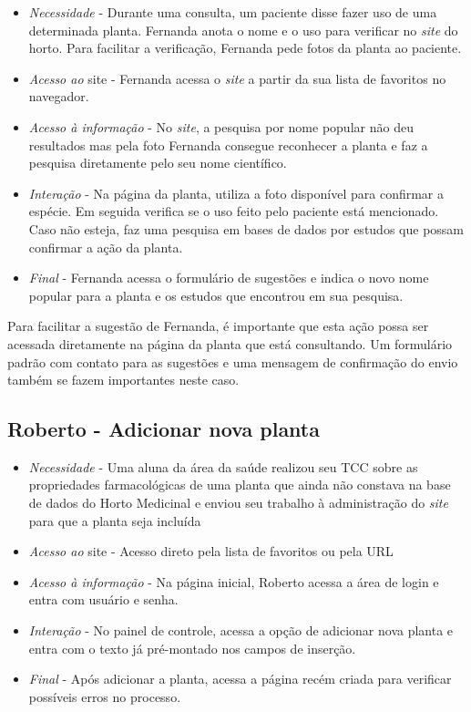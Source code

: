\begin{itemize}
\item
  \emph{Necessidade} - Durante uma consulta, um paciente disse fazer uso de uma determinada planta. Fernanda anota o nome e o uso para verificar no \emph{site} do horto. Para facilitar a verificação, Fernanda pede fotos da planta ao paciente.
\item
  \emph{Acesso ao} site - Fernanda acessa o \emph{site} a partir da sua lista de favoritos no navegador.
\item
  \emph{Acesso à informação} - No \emph{site}, a pesquisa por nome popular não deu resultados mas pela foto Fernanda consegue reconhecer a planta e faz a pesquisa diretamente pelo seu nome científico.
\item
  \emph{Interação} - Na página da planta, utiliza a foto disponível para confirmar a espécie. Em seguida verifica se o uso feito pelo paciente está mencionado. Caso não esteja, faz uma pesquisa em bases de dados por estudos que possam confirmar a ação da planta.
\item
  \emph{Final} - Fernanda acessa o formulário de sugestões e indica o novo nome popular para a planta e os estudos que encontrou em sua pesquisa.
\end{itemize}

Para facilitar a sugestão de Fernanda, é importante que esta ação possa ser acessada diretamente na página da planta que está consultando. Um formulário padrão com contato para as sugestões e uma mensagem de confirmação do envio também se fazem importantes neste caso.

\subsection{Roberto - Adicionar nova planta}\label{roberto---adicionar-nova-planta}

\begin{itemize}
\item
  \emph{Necessidade} - Uma aluna da área da saúde realizou seu TCC sobre as propriedades farmacológicas de uma planta que ainda não constava na base de dados do Horto Medicinal e enviou seu trabalho à administração do \emph{site} para que a planta seja incluída
\item
  \emph{Acesso ao} site - Acesso direto pela lista de favoritos ou pela URL
\item
  \emph{Acesso à informação} - Na página inicial, Roberto acessa a área de login e entra com usuário e senha.
\item
  \emph{Interação} - No painel de controle, acessa a opção de adicionar nova planta e entra com o texto já pré-montado nos campos de inserção.
\item
  \emph{Final} - Após adicionar a planta, acessa a página recém criada para verificar possíveis erros no processo.
\end{itemize}

